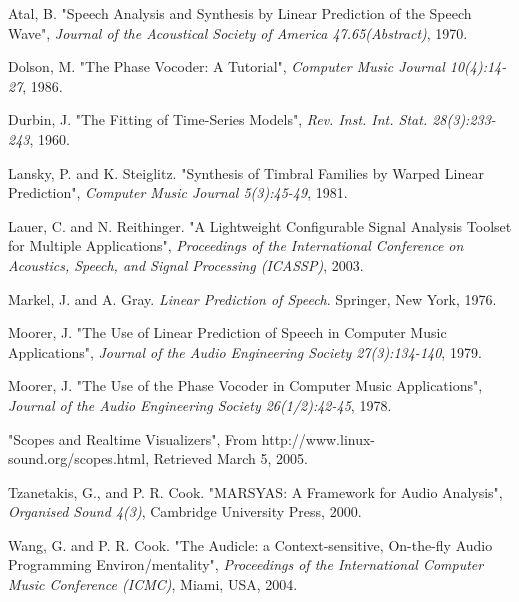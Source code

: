 \documentclass{article}
\begin{document}
\begin{thebibliography}{11}


%
%
 Atal, B.
"Speech Analysis and Synthesis by Linear Prediction of the Speech Wave",
{\it Journal of the Acoustical Society of America 47.65(Abstract)}, 1970.

 Dolson, M. 
"The Phase Vocoder: A Tutorial",  
{\it Computer Music Journal 10(4):14-27}, 1986.

 Durbin, J.
"The Fitting of Time-Series Models", 
{\it Rev. Inst. Int. Stat. 28(3):233-243}, 1960.

 Lansky, P. and K. Steiglitz.  
"Synthesis of Timbral Families by Warped Linear Prediction",
{\it Computer Music Journal 5(3):45-49}, 1981.

 Lauer, C. and N. Reithinger. 
"A Lightweight Configurable Signal Analysis Toolset for Multiple Applications",
{\it Proceedings of the International Conference on Acoustics, Speech, and Signal Processing (ICASSP)}, 2003.

 Markel, J. and A. Gray. 
{\it Linear Prediction of Speech}.
Springer, New York, 1976.

 Moorer, J. 
"The Use of Linear Prediction of Speech in Computer Music Applications",
{\it Journal of the Audio Engineering Society 27(3):134-140}, 1979.

 Moorer, J.
"The Use of the Phase Vocoder in Computer Music Applications",
{\it Journal of the Audio Engineering Society 26(1/2):42-45}, 1978.


"Scopes and Realtime Visualizers", 
From http://www.linux-sound.org/scopes.html, 
Retrieved March 5, 2005.

 Tzanetakis, G., and P. R. Cook.
"MARSYAS: A Framework for Audio Analysis",
{\it Organised Sound 4(3)}, 
Cambridge University Press, 2000. 

 Wang, G. and P. R. Cook.
"The Audicle: a Context-sensitive, On-the-fly Audio Programming
Environ/mentality",
{\it Proceedings of the International Computer Music Conference  (ICMC)},
Miami, USA, 2004.

\end{thebibliography}
\end{document}
